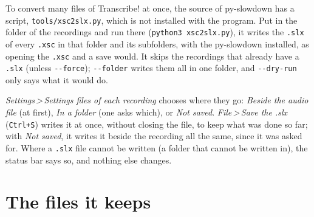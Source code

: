 \documentclass[12pt,
              article,
              oneside
              ]{memoir}
\newcommand*{\menu}[1]{\textit{#1}}
\newcommand*{\then}{\,>\,}
\newcommand*{\key}[1]{\texttt{#1}}
\begin{document}
To convert many files of Transcribe! at once, the source of py-slowdown
has a script, \texttt{tools/xsc2slx.py}, which is not installed with the
program. Put in the folder of the recordings and run there
(\texttt{python3 xsc2slx.py}), it writes the \texttt{.slx} of every
\texttt{.xsc} in that folder and its subfolders, with the py-slowdown
installed, as opening the \texttt{.xsc} and a save would. It skips the
recordings that already have a \texttt{.slx} (unless
\texttt{-{}-force}); \texttt{-{}-folder} writes them all in one folder,
and \texttt{-{}-dry-run} only says what it would do.

\menu{Settings\then Settings files of each recording} chooses where they
go: \menu{Beside the audio file} (at first), \menu{In a folder} (one asks
which), or \menu{Not saved}. \menu{File\then Save the .slx} (\key{Ctrl+S})
writes it at once, without closing the file, to keep what was done so far;
with \menu{Not saved}, it writes it beside the recording all the same,
since it was asked for. Where a \texttt{.slx} file cannot be written (a
folder that cannot be written in), the status bar says so, and nothing else
changes.

\section{The files it keeps}
\label{sec:files-kept}
\end{document}
